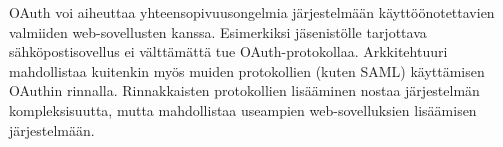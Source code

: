 OAuth voi aiheuttaa yhteensopivuusongelmia järjestelmään käyttöönotettavien valmiiden web-sovellusten kanssa. Esimerkiksi jäsenistölle tarjottava sähköpostisovellus ei välttämättä tue OAuth-protokollaa. Arkkitehtuuri mahdollistaa kuitenkin myös muiden protokollien (kuten SAML) käyttämisen OAuthin rinnalla. Rinnakkaisten protokollien lisääminen nostaa järjestelmän kompleksisuutta, mutta mahdollistaa useampien web-sovelluksien lisäämisen järjestelmään.